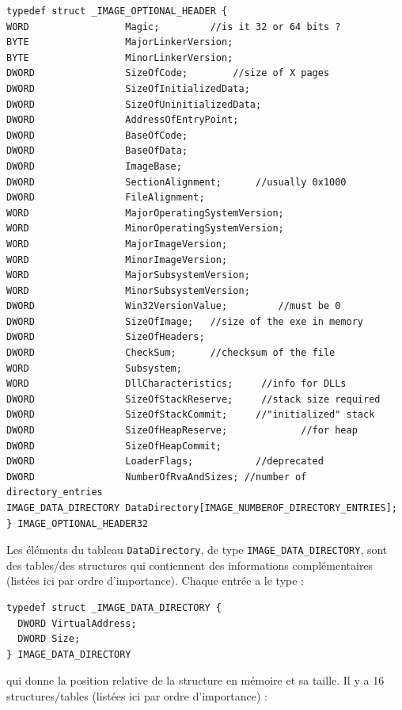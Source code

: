 \documentclass{book}
\newcommand{\code}[1]{\texttt{#1}}
\begin{document}
\begin{verbatim}
typedef struct _IMAGE_OPTIONAL_HEADER {
WORD                 Magic;		    //is it 32 or 64 bits ?
BYTE                 MajorLinkerVersion;
BYTE                 MinorLinkerVersion;
DWORD                SizeOfCode;	   	//size of X pages
DWORD                SizeOfInitializedData;
DWORD                SizeOfUninitializedData;
DWORD                AddressOfEntryPoint;
DWORD                BaseOfCode;
DWORD                BaseOfData;
DWORD                ImageBase;
DWORD                SectionAlignment;    	//usually 0x1000
DWORD                FileAlignment;
WORD                 MajorOperatingSystemVersion;
WORD                 MinorOperatingSystemVersion;
WORD                 MajorImageVersion;
WORD                 MinorImageVersion;
WORD                 MajorSubsystemVersion;
WORD                 MinorSubsystemVersion;
DWORD                Win32VersionValue;		    //must be 0
DWORD                SizeOfImage;  	//size of the exe in memory
DWORD                SizeOfHeaders;
DWORD                CheckSum;	  	//checksum of the file
WORD                 Subsystem;
WORD                 DllCharacteristics;	 //info for DLLs
DWORD                SizeOfStackReserve;	 //stack size required
DWORD                SizeOfStackCommit;  	//"initialized" stack
DWORD                SizeOfHeapReserve;     		//for heap
DWORD                SizeOfHeapCommit;
DWORD                LoaderFlags;			//deprecated
DWORD                NumberOfRvaAndSizes; //number of directory_entries
IMAGE_DATA_DIRECTORY DataDirectory[IMAGE_NUMBEROF_DIRECTORY_ENTRIES];
} IMAGE_OPTIONAL_HEADER32
\end{verbatim}

Les éléments du tableau \code{DataDirectory}, de type \code{IMAGE\_DATA\_DIRECTORY}, sont des  tables/des structures  qui contiennent des informations complémentaires (listées ici par ordre d'importance). Chaque entrée a le type : 

\begin{verbatim}
typedef struct _IMAGE_DATA_DIRECTORY {
  DWORD VirtualAddress;
  DWORD Size;
} IMAGE_DATA_DIRECTORY
\end{verbatim}
qui donne la position relative de la structure en mémoire et sa taille. Il y a 16 structures/tables (listées ici par ordre d'importance) :  
\end{document}
